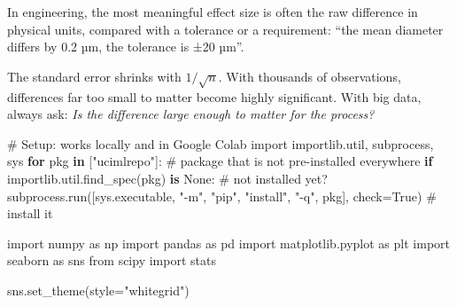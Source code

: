 \documentclass[
  letterpaper,
  DIV=11,
  numbers=noendperiod]{scrreprt}
\newenvironment{Shaded}{\begin{snugshade}}{\end{snugshade}}
\newcommand{\CommentTok}[1]{\textcolor[rgb]{0.37,0.37,0.37}{#1}}
\newcommand{\ControlFlowTok}[1]{\textcolor[rgb]{0.00,0.23,0.31}{\textbf{#1}}}
\newcommand{\ImportTok}[1]{\textcolor[rgb]{0.00,0.46,0.62}{#1}}
\newcommand{\KeywordTok}[1]{\textcolor[rgb]{0.00,0.23,0.31}{\textbf{#1}}}
\newcommand{\NormalTok}[1]{\textcolor[rgb]{0.00,0.23,0.31}{#1}}
\newcommand{\OperatorTok}[1]{\textcolor[rgb]{0.37,0.37,0.37}{#1}}
\newcommand{\StringTok}[1]{\textcolor[rgb]{0.13,0.47,0.30}{#1}}
\newcommand{\VariableTok}[1]{\textcolor[rgb]{0.07,0.07,0.07}{#1}}
\begin{document}
In engineering, the most meaningful effect size is often the raw
difference in physical units, compared with a tolerance or a
requirement: ``the mean diameter differs by 0.2 µm, the tolerance is ±20
µm''.

\begin{tcolorbox}[enhanced jigsaw, left=2mm, title=\textcolor{quarto-callout-warning-color}{\faExclamationTriangle}\hspace{0.5em}{Pitfall: significance with large samples}, opacityback=0, breakable, rightrule=.15mm, arc=.35mm, toptitle=1mm, colbacktitle=quarto-callout-warning-color!10!white, opacitybacktitle=0.6, coltitle=black, colframe=quarto-callout-warning-color-frame, bottomrule=.15mm, leftrule=.75mm, bottomtitle=1mm, titlerule=0mm, toprule=.15mm, colback=white]

The standard error shrinks with \(1/\sqrt{n}\). With thousands of
observations, differences far too small to matter become highly
significant. With big data, always ask: \emph{Is the difference large
enough to matter for the process?}

\end{tcolorbox}

\begin{Shaded}
\begin{Highlighting}[]
\CommentTok{\# Setup: works locally and in Google Colab}
\ImportTok{import}\NormalTok{ importlib.util, subprocess, sys}
\ControlFlowTok{for}\NormalTok{ pkg }\KeywordTok{in}\NormalTok{ [}\StringTok{"ucimlrepo"}\NormalTok{]:                       }\CommentTok{\# package that is not pre{-}installed everywhere}
    \ControlFlowTok{if}\NormalTok{ importlib.util.find\_spec(pkg) }\KeywordTok{is} \VariableTok{None}\NormalTok{:   }\CommentTok{\# not installed yet?}
\NormalTok{        subprocess.run([sys.executable, }\StringTok{"{-}m"}\NormalTok{, }\StringTok{"pip"}\NormalTok{, }\StringTok{"install"}\NormalTok{, }\StringTok{"{-}q"}\NormalTok{, pkg], check}\OperatorTok{=}\VariableTok{True}\NormalTok{)  }\CommentTok{\# install it}

\ImportTok{import}\NormalTok{ numpy }\ImportTok{as}\NormalTok{ np}
\ImportTok{import}\NormalTok{ pandas }\ImportTok{as}\NormalTok{ pd}
\ImportTok{import}\NormalTok{ matplotlib.pyplot }\ImportTok{as}\NormalTok{ plt}
\ImportTok{import}\NormalTok{ seaborn }\ImportTok{as}\NormalTok{ sns}
\ImportTok{from}\NormalTok{ scipy }\ImportTok{import}\NormalTok{ stats}

\NormalTok{sns.set\_theme(style}\OperatorTok{=}\StringTok{"whitegrid"}\NormalTok{)}
\end{Highlighting}
\end{Shaded}
\end{document}
